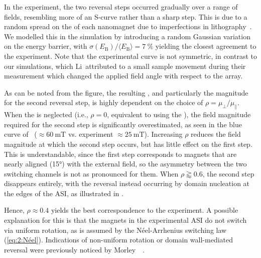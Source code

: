 In the experiment, the two reversal steps occurred gradually over a range of fields, resembling more of an S-curve rather than a sharp step.
This is due to a random spread on the  of each nanomagnet due to imperfections in lithography~\cite{fraleigh2017characterization}. %
We modelled this in the simulation by introducing a random Gaussian variation on the energy barrier, with $\sigma(E_\mathrm{B})/\langle E_\mathrm{B} \rangle=\SI{7}{\percent}$ yielding the closest agreement to the experiment.
Note that the experimental  curve is not symmetric, in contrast to our simulations, which Li~\etal attributed to a small sample movement during their measurement which changed the applied field angle with respect to the array. \par
As can be noted from the figure, the resulting , and particularly the  magnitude for the second reversal step, is highly dependent on the choice of $\rho=\mu_\perp/\mu_\parallel$.
When the  is neglected (i.e., $\rho=0$, equivalent to using the ), the field magnitude required for the second step is significantly overestimated, as seen in the blue curve of~ ($\approx\SI{60}{\milli\tesla}$ vs. experiment $\approx\SI{25}{\milli\tesla}$).
Increasing $\rho$ reduces the field magnitude at which the second step occurs, but has little effect on the first step.
This is understandable, since the first step corresponds to magnets that are nearly aligned (\ang{15}) with the external field, so the asymmetry between the two switching channels is not as pronounced for them.
When $\rho \gtrapprox 0.6$, the second step disappears entirely, with the reversal instead occurring by domain nucleation at the edges of the ASI, as illustrated in . \par
Hence, $\rho \approx 0.4$ yields the best correspondence to the experiment.
A possible explanation for this is that the magnets in the experimental ASI do not switch via uniform rotation, as is assumed by the N\'eel-Arrhenius switching law (\cref{eq:2:Néel}).
Indications of non-uniform rotation or domain wall-mediated reversal were previously noticed by Morley~\etal~\cite{VogelFulcherTammannFreezing}.

